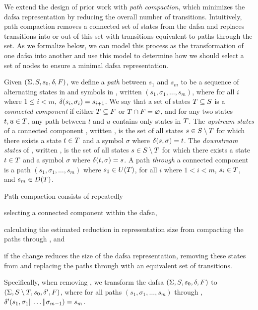 We extend the design of prior work with \emph{path compaction}, which
minimizes the \ac{dafsa} representation by reducing the overall number of
transitions. Intuitively, path compaction removes a connected set of states from
the \ac{dafsa} and replaces transitions into or out of this set with transitions
equivalent to paths through the set. As we formalize below, we can model this
process as the transformation of one \ac{dafsa} into another and use this model
to determine how we should select a set of nodes to ensure a minimal \ac{dafsa}
representation.

Given  $(\Sigma, S, s_0, \delta, F)$,
we define a \emph{path} between $s_1$ and $s_m$ to be a sequence of alternating
states in \states and symbols in \symbols, written $(s_1, \sigma_1, \ldots,
s_m)$, where for all $i$ where $1 \le i < m$, $\delta(s_i, \sigma_i)
= s_{i+1}$.
We say that a set of states $T
\subseteq S$ is a \emph{connected component} if either $T
\subseteq F$ or $T \cap F = \varnothing$, and for
any two states $t, u \in T$, 
any path between $t$ and $u$ contains only states in $T$.
The \emph{upstream states} of a connected component \stateset, written
\upstream{\stateset}, is the set of all states $s \in S \setminus
T$ for which there exists a state $t \in T$ and a symbol
$\sigma$ where $\delta(s, \sigma) = t$. The \emph{downstream states} of
\stateset, written \downstream{\stateset}, is the set of all states $s \in
S \setminus T$ for which there exists a state $t \in T$
and a symbol $\sigma$ where $\delta(t, \sigma) = s$. A path \emph{through} a
connected component \stateset is a path $(s_1, \sigma_1, \ldots, s_m)$ where
$s_1 \in U(T)$, for all $i$ where $1 < i < m$, $s_i \in
T$, and $s_m \in D(T)$.

Path compaction consists of repeatedly
\begin{inparaenum}
\item selecting a connected component \stateset within the \ac{dafsa},
\item calculating the estimated reduction in representation size from compacting
  the paths through \stateset, and
\item if the change reduces the size of the \ac{dafsa} representation, removing
  these states from \states and replacing the paths through \stateset with an
  equivalent set of transitions.
\end{inparaenum}
Specifically, when removing \stateset, we transform the \ac{dafsa} $(\Sigma,
S, s_0, \delta, F)$ to $(\Sigma, S \setminus
T, s_0, \delta', F)$, where for all paths $(s_1,
\sigma_1, \ldots, s_m)$ through \stateset, $\delta'(s_1, \sigma_1 \| \dots \|
\sigma_{m-1}) = s_m$.

